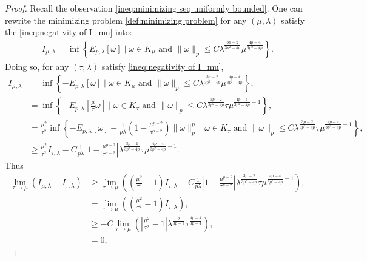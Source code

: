 \documentclass[11pt,letterpaper]{amsart}
\theoremstyle{definition}
\theoremstyle{remark}
\renewcommand{\tt}[1]{\text{#1}}
\numberwithin{equation}{section}
\begin{document}
\begin{proof}
    Recall the observation \eqref{ineq:minimizing seq uniformly bounded}. One can rewrite the minimizing problem \eqref{def:minimizing problem} for any $(\mu,\lambda)$ satisfy the \eqref{ineq:negativity of I_mu} into:
    \begin{align}
        I_{\mu,\lambda}=\inf\left\{ E_{p,\lambda}[\omega] \mid \omega\in K_\mu \tt{ and } \|\omega\|_p\leq C\lambda^{\frac{3p-2}{3p^2-4p}}\mu^{\frac{4p-4}{3p^2-4p}} \right\}. \label{def:alternative minimizing problem}
    \end{align}
    Doing so, for any $(\tau,\lambda)$ satisfy \eqref{ineq:negativity of I_mu}, 
    \begin{align*}
        I_{\mu,\lambda} & =\inf\left\{ -E_{p,\lambda}[\omega] \mid \omega\in K_\mu \tt{ and } \|\omega\|_p\leq C\lambda^{\frac{3p-2}{3p^2-4p}}\mu^{\frac{4p-4}{3p^2-4p}} \right\}, \\ 
        & =\inf\left\{ -E_{p,\lambda}[\frac{\mu}{\tau}\omega] \mid \omega\in K_\tau \tt{ and } \|\omega\|_p\leq C\lambda^{\frac{3p-2}{3p^2-4p}}\tau \mu^{\frac{4p-4}{3p^2-4p}-1} \right\}, \\
        & =\frac{\mu^2}{\tau^2} \inf\left\{  -E_{p,\lambda}[\omega] - \frac{1}{p\lambda}\left( 1 - \frac{\mu^{p-2}}{\tau^{p-2}} \right)\|\omega\|_p^p \mid \omega\in K_\tau \tt{ and } \|\omega\|_p\leq C\lambda^{\frac{3p-2}{3p^2-4p}}\tau \mu^{\frac{4p-4}{3p^2-4p}-1} \right\}, \\ 
        & \geq \frac{\mu^2}{\tau^2} I_{\tau,\lambda} - C\frac{1}{p \lambda}\left| 1 - \frac{\mu^{p-2}}{\tau^{p-2}} \right|\lambda^{\frac{3p-2}{3p^2-4p}}\tau \mu^{\frac{4p-4}{3p^2-4p}-1}.
    \end{align*}
    Thus 
    \begin{align*}
        \lim_{\tau\rightarrow\mu}\left( I_{\mu,\lambda} - I_{\tau,\lambda}\right) 
        & \geq  \lim_{\tau\rightarrow\mu}\left( \left(\frac{\mu^2}{\tau^2} -1\right)I_{\tau,\lambda} - C\frac{1}{p \lambda}\left| 1 - \frac{\mu^{p-2}}{\tau^{p-2}} \right|\lambda^{\frac{3p-2}{3p^2-4p}}\tau \mu^{\frac{4p-4}{3p^2-4p}-1} \right), \\
        & = \lim_{\tau\rightarrow\mu}\left( \left(\frac{\mu^2}{\tau^2} -1\right)I_{\tau,\lambda} \right), \\
        & \geq -C\lim_{\tau\rightarrow\mu}\left( \left|\frac{\mu^2}{\tau^2} -1\right|\lambda^{\frac{2}{3p-4}}\tau^{\frac{4p-4}{3p-4}}\right), \\
        & =0,
    \end{align*}

\end{proof}
\end{document}
